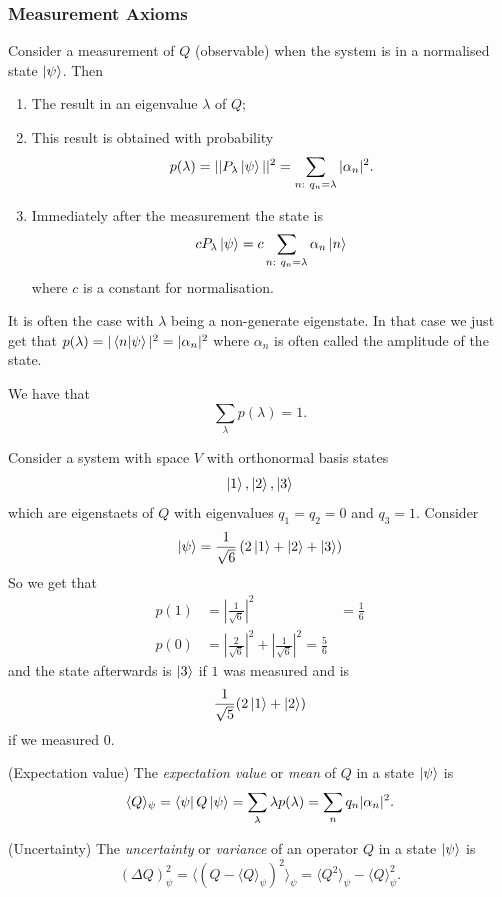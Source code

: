 \documentclass{article}
\begin{document}
\subsubsection{Measurement Axioms}
Consider a measurement of $ Q $ (observable) when the system is in a normalised state $ \ket \psi $. Then
\begin{enumerate}
	\item The result in an eigenvalue $ \lambda $ of $ Q $;
	\item This result is obtained with probability
		\[
			p(\lambda) = ||P_\lambda \ket \psi ||^2 = \sum_{n:\ q_n=\lambda} |\alpha_n|^2.
		\]
	\item Immediately after the measurement the state is
		\[
			c P_\lambda \ket \psi = c\sum_{n:\ q_n=\lambda} \alpha_n \ket n
		\]
		where $ c $ is a constant for normalisation. 
\end{enumerate}
It is often the case with $ \lambda $ being a non-generate eigenstate. In that case we just get that $ p(\lambda) = |\bra{n}\ket{\psi}|^2 = |\alpha_n|^2 $ where $ \alpha_n $ is often called the amplitude of the state.
\par
We have that 
\[
	\sum_{\lambda} p(\lambda) = 1.
\]
\begin{example}
  Consider a system with space $ V $ with orthonormal basis states
  \[
    \ket 1, \ket 2, \ket 3
  \]
  which are eigenstaets of $ Q $ with eigenvalues $ q_1=q_2 = 0 $ and $ q_3 = 1 $. Consider
  \[
	  \ket \psi = \frac 1{\sqrt 6}\left(2 \ket 1 + \ket 2 + \ket 3\right)
  \]
  So we get that
  \begin{align*}
	  p(1) &= \left|\frac 1{\sqrt 6}\right|^2 & = \frac 16 \\
	  p(0) &= \left|\frac 2{\sqrt 6}\right|^2 + \left|\frac 1{\sqrt 6}\right|^2 = \frac 56
  \end{align*}
  and the state afterwards is $ \ket 3 $ if $ 1 $ was measured and is 
  \[
  \frac 1{\sqrt 5}(2 \ket 1 + \ket 2)  
  \]
  if we measured $ 0 $.
\end{example}
\begin{definition}
	(Expectation value) The \textit{expectation value} or \textit{mean} of $ Q $ in a state $ \ket \psi $ is
	\[
	  \langle Q\rangle_\psi = \bra \psi Q \ket \psi = \sum_\lambda \lambda p(\lambda) = \sum_n q_n|\alpha_n|^2. 
	\]
\end{definition}
\begin{definition}
	(Uncertainty) The \textit{uncertainty} or \textit{variance} of an operator $ Q $ in a state $ \ket \psi $ is
	\[
	  \left(\Delta Q\right)^2_\psi = \langle (Q-\langle Q\rangle_\psi)^2\rangle_\psi = \langle Q^2 \rangle_\psi - \langle Q\rangle^2_\psi.
	\]
\end{definition}
\end{document}
